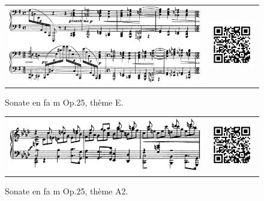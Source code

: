 \begin{figure}[!ht]
  \begin{bigcenter}
    \begin{tabular}{lr}
      \includegraphics[width=12.5cm, keepaspectratio]{sonate-theme-E.png}
      &
      \includegraphics[width=3cm, keepaspectratio]{op1-qr.png}
    \end{tabular}
  \end{bigcenter}
  \caption{\label{sonate-theme-5}Sonate en fa m Op.25, thème E.}
\end{figure}

\begin{figure}[!ht]
  \begin{bigcenter}
    \begin{tabular}{lr}
      \includegraphics[width=12.5cm, keepaspectratio]{sonate-theme-A2.png}
      &
      \includegraphics[width=3cm, keepaspectratio]{op1-qr.png}
    \end{tabular}
  \end{bigcenter}
  \caption{\label{sonate-theme-12}Sonate en fa m Op.25, thème A2.}
\end{figure}

